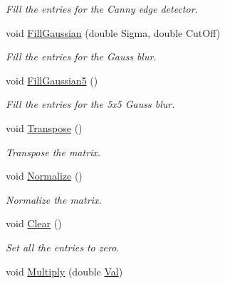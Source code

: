 \begin{DoxyCompactItemize}
\begin{DoxyCompactList}\small\item\em \-Fill the entries for the \-Canny edge detector. \end{DoxyCompactList}\item 
\hypertarget{classMatrice_a5ceb29f59f80d11657e7d9cb7ab442d0}{void \hyperlink{classMatrice_a5ceb29f59f80d11657e7d9cb7ab442d0}{\-Fill\-Gaussian} (double \-Sigma, double \-Cut\-Off)}\label{classMatrice_a5ceb29f59f80d11657e7d9cb7ab442d0}

\begin{DoxyCompactList}\small\item\em \-Fill the entries for the \-Gauss blur. \end{DoxyCompactList}\item 
\hypertarget{classMatrice_a0173aba64404b8145dda86796cb34231}{void \hyperlink{classMatrice_a0173aba64404b8145dda86796cb34231}{\-Fill\-Gaussian5} ()}\label{classMatrice_a0173aba64404b8145dda86796cb34231}

\begin{DoxyCompactList}\small\item\em \-Fill the entries for the 5x5 \-Gauss blur. \end{DoxyCompactList}\item 
\hypertarget{classMatrice_a109318636af36bc89e9853f19e4369e2}{void \hyperlink{classMatrice_a109318636af36bc89e9853f19e4369e2}{\-Transpose} ()}\label{classMatrice_a109318636af36bc89e9853f19e4369e2}

\begin{DoxyCompactList}\small\item\em \-Transpose the matrix. \end{DoxyCompactList}\item 
\hypertarget{classMatrice_af279e0f0ff720ee54d6733674dfda50a}{void \hyperlink{classMatrice_af279e0f0ff720ee54d6733674dfda50a}{\-Normalize} ()}\label{classMatrice_af279e0f0ff720ee54d6733674dfda50a}

\begin{DoxyCompactList}\small\item\em \-Normalize the matrix. \end{DoxyCompactList}\item 
\hypertarget{classMatrice_aa71d36872f416feaa853788a7a7a7ef8}{void \hyperlink{classMatrice_aa71d36872f416feaa853788a7a7a7ef8}{\-Clear} ()}\label{classMatrice_aa71d36872f416feaa853788a7a7a7ef8}

\begin{DoxyCompactList}\small\item\em \-Set all the entries to zero. \end{DoxyCompactList}\item 
\hypertarget{classMatrice_a5361e904e6972f204c5a22456e4b2160}{void \hyperlink{classMatrice_a5361e904e6972f204c5a22456e4b2160}{\-Multiply} (double \hyperlink{classMatrice_a2a233d9af97c320a1b372ededf056886}{\-Val})}\label{classMatrice_a5361e904e6972f204c5a22456e4b2160}


\end{DoxyCompactItemize}
